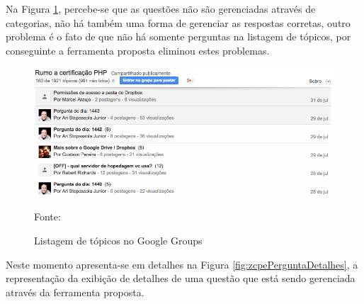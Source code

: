 \FloatBarrier 	%

Na Figura \ref{fig:googleGroupsListagemTopicos}, percebe-se que as questões não
são gerenciadas através de categorias, não há também uma forma de gerenciar as
respostas corretas, outro problema é o fato de que não há somente perguntas na 
listagem de tópicos, por conseguinte a ferramenta proposta eliminou estes
problemas.

\begin{figure}[h!tb]
	\caption{Listagem de tópicos no Google Groups}
	\label{fig:googleGroupsListagemTopicos}

	\centering
	\includegraphics[width=\textwidth]{images/resultados/google-groups-listagem.png}

	\centering
	\footnotesize Fonte: \fonteOAutor
\end{figure}

\FloatBarrier 	%

Neste momento apresenta-se em detalhes na Figura \ref{fig:zcpePerguntaDetalhes},
a representação da exibição de detalhes de uma questão que está sendo gerenciada
através da ferramenta proposta.

